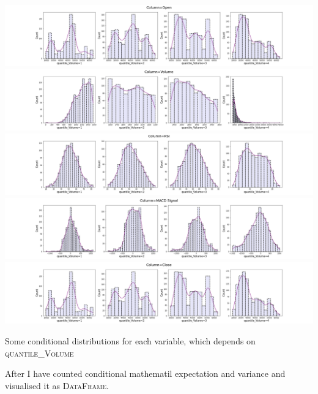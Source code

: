 \documentclass[%
12pt, %
final, %
oneside, %
onecolumn, %
centertags]{article} %
\theoremstyle{plain}
\theoremstyle{definition}
\theoremstyle{remark}
\begin{document}
\begin{center}
\includegraphics[scale=0.3]{images/conditional_distr_column_Open.png}
\includegraphics[scale=0.3]{images/conditional_distr_column_Volume.png}
\includegraphics[scale=0.3]{images/conditional_distr_column_RSI.png}
\includegraphics[scale=0.3]{images/conditional_distr_column_MACD Signal.png}
\includegraphics[scale=0.3]{images/conditional_distr_column_Close.png}

Some conditional distributions for each variable, which depends on \textsc{quantile\_Volume}
\end{center}

After I have counted conditional mathematil expectation and variance and visualised it as \textsc{DataFrame}.
\end{document}
